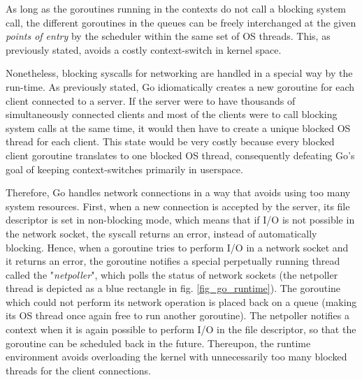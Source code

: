 As long as the goroutines running in the contexts do not call a blocking system call, the different goroutines in the queues can be freely interchanged at the given \textit{points of entry} by the scheduler within the same set of OS threads. This, as previously stated, avoids a costly context-switch in kernel space. 

Nonetheless, blocking syscalls for networking are handled in a special way by the run-time. As previously stated, Go idiomatically creates a new goroutine for each client connected to a server. If the server were to have thousands of simultaneously connected clients and most of the clients were to call blocking system calls at the same time, it would then have to create a unique blocked OS thread for each client. This state would be very costly because every blocked client goroutine translates to one blocked OS thread, consequently defeating Go's goal of keeping context-switches primarily in userspace.

Therefore, Go handles network connections in a way that avoids using too many system resources. First, when a new connection is accepted by the server, its file descriptor is set in non-blocking mode, which means that if I/O is not possible in the network socket, the syscall returns an error, instead of automatically blocking. Hence, when a goroutine tries to perform I/O in a network socket and it returns an error, the goroutine notifies a special perpetually running thread called the "\textit{netpoller}", which polls the status of network sockets \cite{Morsing2013_2} (the netpoller thread is depicted as a blue rectangle in fig. \ref{fig_go_runtime}). The goroutine which could not perform its network operation is placed back on a queue (making its OS thread once again free to run another goroutine). The netpoller notifies a context when it is again possible to perform I/O in the file descriptor, so that the goroutine can be scheduled back in the future. Thereupon, the runtime environment avoids overloading the kernel with unnecessarily too many blocked threads for the client connections.